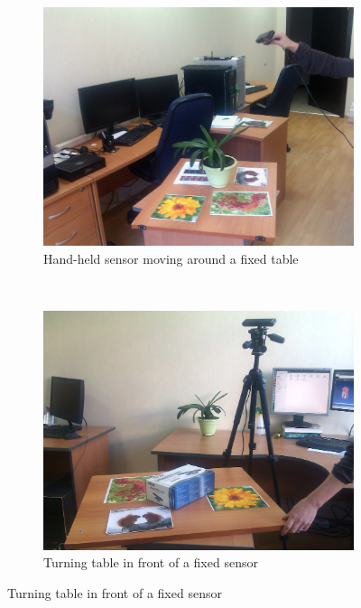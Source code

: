 \documentclass[letterpaper, 10 pt, conference]{ieeeconf}  %
\begin{document}
\begin{figure}[t]
        \begin{subfigure}[b]{0.49\linewidth}
                \centering
                \includegraphics[width=\linewidth]{../tizer/handHeld.jpg}
                \caption{Hand-held sensor moving around a fixed table}
        \end{subfigure}%
        ~ %
        \begin{subfigure}[b]{0.49\linewidth}
                \centering
                \includegraphics[width=\linewidth]{../tizer/turntable.jpg}
                \caption{Turning table in front of a fixed sensor}
        \end{subfigure}
        

\end{figure}
\end{document}
